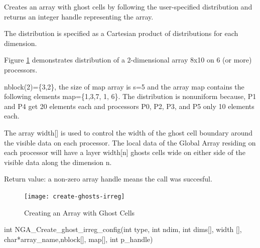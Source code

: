 \documentclass[10pt]{article}
\begin{document}
\begin{desc}

Creates an array with ghost cells by following the user-specified distribution
and returns an integer handle representing the array.

The distribution is specified as a Cartesian product of distributions for each
dimension.

Figure \ref{crghostir} demonstrates distribution of a 2-dimensional array 8x10
on 6 (or more) processors.

nblock(2)=\{3,2\}, the size of map array is s=5 and the array map contains the
following elements map=\{1,3,7, 1, 6\}. The distribution is nonuniform because,
P1 and P4 get 20 elements each and processors P0, P2, P3, and P5 only 10
elements each.

The array width[] is used to control the width of the ghost cell boundary
around the visible data on each processor. The local data of the Global Array
residing on each processor will have a layer width[n] ghosts cells wide on
either side of the visible data along the dimension n.

Return value: a non-zero array handle means the call was succesful.

\begin{figure}
\texttt{[image: create-ghosts-irreg]}
\centering
\caption{Creating an Array with Ghost Cells}
\label{crghostir}
\end{figure}

\end{desc}



\begin{capi}
\begin{ccode}
int NGA_Create_ghost_irreg_config(int type, int ndim, int dims[],
                                  width [], char*array_name,nblock[],
                                  map[], int p_handle)
\end{ccode}
\begin{funcargs}
\end{funcargs}
\end{capi}
\end{document}
